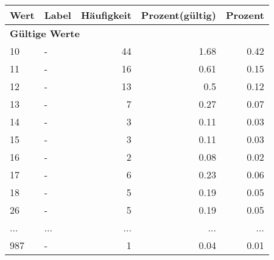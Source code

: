      \begin{longtable}{lXrrr}
     \toprule
     \textbf{Wert} & \textbf{Label} & \textbf{Häufigkeit} & \textbf{Prozent(gültig)} & \textbf{Prozent} \\
     \endhead
     \midrule
     \multicolumn{5}{l}{\textbf{Gültige Werte}}\\
        10 & \multicolumn{1}{X}{-} & %
          \num{44} &
          \num[round-mode=places,round-precision=2]{1.68} &
          \num[round-mode=places,round-precision=2]{0.42} \\
        11 & \multicolumn{1}{X}{-} & %
          \num{16} &
          \num[round-mode=places,round-precision=2]{0.61} &
          \num[round-mode=places,round-precision=2]{0.15} \\
        12 & \multicolumn{1}{X}{-} & %
          \num{13} &
          \num[round-mode=places,round-precision=2]{0.5} &
          \num[round-mode=places,round-precision=2]{0.12} \\
        13 & \multicolumn{1}{X}{-} & %
          \num{7} &
          \num[round-mode=places,round-precision=2]{0.27} &
          \num[round-mode=places,round-precision=2]{0.07} \\
        14 & \multicolumn{1}{X}{-} & %
          \num{3} &
          \num[round-mode=places,round-precision=2]{0.11} &
          \num[round-mode=places,round-precision=2]{0.03} \\
        15 & \multicolumn{1}{X}{-} & %
          \num{3} &
          \num[round-mode=places,round-precision=2]{0.11} &
          \num[round-mode=places,round-precision=2]{0.03} \\
        16 & \multicolumn{1}{X}{-} & %
          \num{2} &
          \num[round-mode=places,round-precision=2]{0.08} &
          \num[round-mode=places,round-precision=2]{0.02} \\
        17 & \multicolumn{1}{X}{-} & %
          \num{6} &
          \num[round-mode=places,round-precision=2]{0.23} &
          \num[round-mode=places,round-precision=2]{0.06} \\
        18 & \multicolumn{1}{X}{-} & %
          \num{5} &
          \num[round-mode=places,round-precision=2]{0.19} &
          \num[round-mode=places,round-precision=2]{0.05} \\
        26 & \multicolumn{1}{X}{-} & %
          \num{5} &
          \num[round-mode=places,round-precision=2]{0.19} &
          \num[round-mode=places,round-precision=2]{0.05} \\
       ... & ... & ... & ... & ... \\
        987 & \multicolumn{1}{X}{-} & %
          \num{1} &
          \num[round-mode=places,round-precision=2]{0.04} &
          \num[round-mode=places,round-precision=2]{0.01} \\


\end{longtable}

